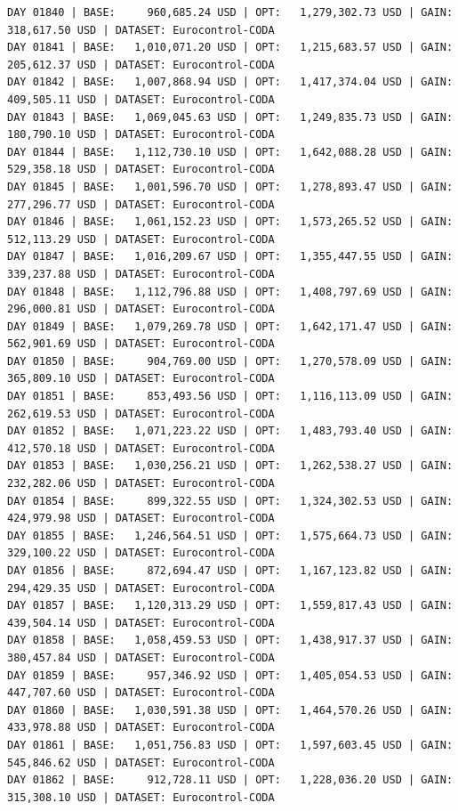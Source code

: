 \documentclass[11pt,a4paper]{article}
\begin{document}
\begin{verbatim}
DAY 01840 | BASE:     960,685.24 USD | OPT:   1,279,302.73 USD | GAIN: 318,617.50 USD | DATASET: Eurocontrol-CODA
DAY 01841 | BASE:   1,010,071.20 USD | OPT:   1,215,683.57 USD | GAIN: 205,612.37 USD | DATASET: Eurocontrol-CODA
DAY 01842 | BASE:   1,007,868.94 USD | OPT:   1,417,374.04 USD | GAIN: 409,505.11 USD | DATASET: Eurocontrol-CODA
DAY 01843 | BASE:   1,069,045.63 USD | OPT:   1,249,835.73 USD | GAIN: 180,790.10 USD | DATASET: Eurocontrol-CODA
DAY 01844 | BASE:   1,112,730.10 USD | OPT:   1,642,088.28 USD | GAIN: 529,358.18 USD | DATASET: Eurocontrol-CODA
DAY 01845 | BASE:   1,001,596.70 USD | OPT:   1,278,893.47 USD | GAIN: 277,296.77 USD | DATASET: Eurocontrol-CODA
DAY 01846 | BASE:   1,061,152.23 USD | OPT:   1,573,265.52 USD | GAIN: 512,113.29 USD | DATASET: Eurocontrol-CODA
DAY 01847 | BASE:   1,016,209.67 USD | OPT:   1,355,447.55 USD | GAIN: 339,237.88 USD | DATASET: Eurocontrol-CODA
DAY 01848 | BASE:   1,112,796.88 USD | OPT:   1,408,797.69 USD | GAIN: 296,000.81 USD | DATASET: Eurocontrol-CODA
DAY 01849 | BASE:   1,079,269.78 USD | OPT:   1,642,171.47 USD | GAIN: 562,901.69 USD | DATASET: Eurocontrol-CODA
DAY 01850 | BASE:     904,769.00 USD | OPT:   1,270,578.09 USD | GAIN: 365,809.10 USD | DATASET: Eurocontrol-CODA
DAY 01851 | BASE:     853,493.56 USD | OPT:   1,116,113.09 USD | GAIN: 262,619.53 USD | DATASET: Eurocontrol-CODA
DAY 01852 | BASE:   1,071,223.22 USD | OPT:   1,483,793.40 USD | GAIN: 412,570.18 USD | DATASET: Eurocontrol-CODA
DAY 01853 | BASE:   1,030,256.21 USD | OPT:   1,262,538.27 USD | GAIN: 232,282.06 USD | DATASET: Eurocontrol-CODA
DAY 01854 | BASE:     899,322.55 USD | OPT:   1,324,302.53 USD | GAIN: 424,979.98 USD | DATASET: Eurocontrol-CODA
DAY 01855 | BASE:   1,246,564.51 USD | OPT:   1,575,664.73 USD | GAIN: 329,100.22 USD | DATASET: Eurocontrol-CODA
DAY 01856 | BASE:     872,694.47 USD | OPT:   1,167,123.82 USD | GAIN: 294,429.35 USD | DATASET: Eurocontrol-CODA
DAY 01857 | BASE:   1,120,313.29 USD | OPT:   1,559,817.43 USD | GAIN: 439,504.14 USD | DATASET: Eurocontrol-CODA
DAY 01858 | BASE:   1,058,459.53 USD | OPT:   1,438,917.37 USD | GAIN: 380,457.84 USD | DATASET: Eurocontrol-CODA
DAY 01859 | BASE:     957,346.92 USD | OPT:   1,405,054.53 USD | GAIN: 447,707.60 USD | DATASET: Eurocontrol-CODA
DAY 01860 | BASE:   1,030,591.38 USD | OPT:   1,464,570.26 USD | GAIN: 433,978.88 USD | DATASET: Eurocontrol-CODA
DAY 01861 | BASE:   1,051,756.83 USD | OPT:   1,597,603.45 USD | GAIN: 545,846.62 USD | DATASET: Eurocontrol-CODA
DAY 01862 | BASE:     912,728.11 USD | OPT:   1,228,036.20 USD | GAIN: 315,308.10 USD | DATASET: Eurocontrol-CODA

\end{verbatim}
\end{document}
